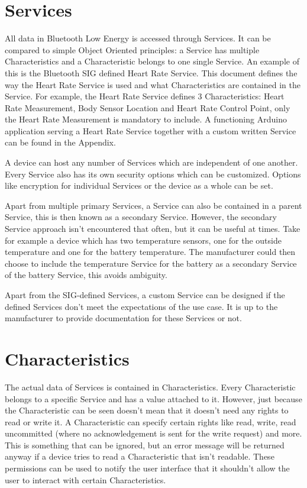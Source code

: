 \documentclass[pdftex,a4paper,12pt,twoside]{report}
\begin{document}
\section{Services}
\label{sec:services}
All data in Bluetooth Low Energy is accessed through Services. It can be compared to simple Object Oriented principles: a Service has multiple Characteristics and a Characteristic belongs to one single Service. An example of this is the Bluetooth SIG defined Heart Rate Service. This document defines the way the Heart Rate Service is used and what Characteristics are contained in the Service. For example, the Heart Rate Service defines 3 Characteristics: Heart Rate Measurement, Body Sensor Location and Heart Rate Control Point, only the Heart Rate Measurement is mandatory to include. A functioning Arduino application serving a Heart Rate Service together with a custom written Service can be found in the Appendix.

A device can host any number of Services which are independent of one another. Every Service also has its own security options which can be customized. Options like encryption for individual Services or the device as a whole can be set.

Apart from multiple primary Services, a Service can also be contained in a parent Service, this is then known as a secondary Service. However, the secondary Service approach isn't encountered that often, but it can be useful at times. Take for example a device which has two temperature sensors, one for the outside temperature and one for the battery temperature. The manufacturer could then choose to include the temperature Service for the battery as a secondary Service of the battery Service, this avoids ambiguity.

Apart from the SIG-defined Services, a custom Service can be designed if the defined Services don't meet the expectations of the use case. It is up to the manufacturer to provide documentation for these Services or not.

\section{Characteristics}
\label{sec:characteristics}
The actual data of Services is contained in Characteristics. Every Characteristic belongs to a specific Service and has a value attached to it. However, just because the Characteristic can be seen doesn't mean that it doesn't need any rights to read or write it. A Characteristic can specify certain rights like read, write, read uncommitted (where no acknowledgement is sent for the write request) and more. This is something that can be ignored, but an error message will be returned anyway if a device tries to read a Characteristic that isn't readable. These permissions can be used to notify the user interface that it shouldn't allow the user to interact with certain Characteristics.
\end{document}
